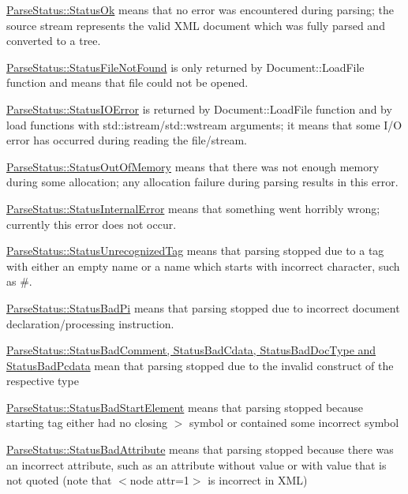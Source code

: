 \begin{DoxyItemize}
\item \hyperlink{namespacephys_1_1xml_ae7aabb879b21c73d8183a54470f8917f}{ParseStatus::StatusOk} means that no error was encountered during parsing; the source stream represents the valid XML document which was fully parsed and converted to a tree.
\item \hyperlink{namespacephys_1_1xml_ae7aabb879b21c73d8183a54470f8917f}{ParseStatus::StatusFileNotFound} is only returned by Document::LoadFile function and means that file could not be opened.
\item \hyperlink{namespacephys_1_1xml_ae7aabb879b21c73d8183a54470f8917f}{ParseStatus::StatusIOError} is returned by Document::LoadFile function and by load functions with std::istream/std::wstream arguments; it means that some I/O error has occurred during reading the file/stream.
\item \hyperlink{namespacephys_1_1xml_ae7aabb879b21c73d8183a54470f8917f}{ParseStatus::StatusOutOfMemory} means that there was not enough memory during some allocation; any allocation failure during parsing results in this error.
\item \hyperlink{namespacephys_1_1xml_ae7aabb879b21c73d8183a54470f8917f}{ParseStatus::StatusInternalError} means that something went horribly wrong; currently this error does not occur.
\item \hyperlink{namespacephys_1_1xml_ae7aabb879b21c73d8183a54470f8917f}{ParseStatus::StatusUnrecognizedTag} means that parsing stopped due to a tag with either an empty name or a name which starts with incorrect character, such as \#.
\item \hyperlink{namespacephys_1_1xml_ae7aabb879b21c73d8183a54470f8917f}{ParseStatus::StatusBadPi} means that parsing stopped due to incorrect document declaration/processing instruction.
\item \hyperlink{namespacephys_1_1xml_ae7aabb879b21c73d8183a54470f8917f}{ParseStatus::StatusBadComment, StatusBadCdata, StatusBadDocType and StatusBadPcdata} mean that parsing stopped due to the invalid construct of the respective type
\item \hyperlink{namespacephys_1_1xml_ae7aabb879b21c73d8183a54470f8917f}{ParseStatus::StatusBadStartElement} means that parsing stopped because starting tag either had no closing $>$ symbol or contained some incorrect symbol
\item \hyperlink{namespacephys_1_1xml_ae7aabb879b21c73d8183a54470f8917f}{ParseStatus::StatusBadAttribute} means that parsing stopped because there was an incorrect attribute, such as an attribute without value or with value that is not quoted (note that $<$node attr=1$>$ is incorrect in XML)

\end{DoxyItemize}
